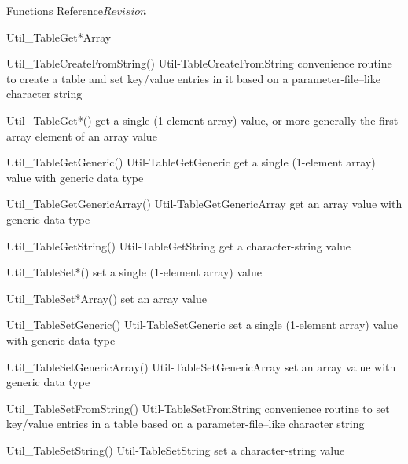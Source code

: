 \begin{cactuspart}{ Functions Reference}{}{$Revision$}
\begin{FunctionDescription}{Util\_TableGet*Array}
\begin{SeeAlsoSection}
\begin{SeeAlso2} {Util\_TableCreateFromString()} {Util-TableCreateFromString}
convenience routine to create a table and set key/value entries
in it based on a parameter-file--like character string
\end{SeeAlso2}
\begin{SeeAlso}{Util\_TableGet*()}
get a single (1-element array) value,
or more generally the first array element of an array value
\end{SeeAlso}
\begin{SeeAlso2} {Util\_TableGetGeneric()} {Util-TableGetGeneric}
get a single (1-element array) value with generic data type
\end{SeeAlso2}
\begin{SeeAlso2} {Util\_TableGetGenericArray()} {Util-TableGetGenericArray}
get an array value with generic data type
\end{SeeAlso2}
\begin{SeeAlso2} {Util\_TableGetString()} {Util-TableGetString}
get a character-string value
\end{SeeAlso2}
\begin{SeeAlso}{Util\_TableSet*()}
set a single (1-element array) value
\end{SeeAlso}
\begin{SeeAlso}{Util\_TableSet*Array()}
set an array value
\end{SeeAlso}
\begin{SeeAlso2} {Util\_TableSetGeneric()} {Util-TableSetGeneric}
set a single (1-element array) value with generic data type
\end{SeeAlso2}
\begin{SeeAlso2} {Util\_TableSetGenericArray()} {Util-TableSetGenericArray}
set an array value with generic data type
\end{SeeAlso2}
\begin{SeeAlso2} {Util\_TableSetFromString()} {Util-TableSetFromString}
convenience routine to set key/value entries in a table based on a
parameter-file--like character string
\end{SeeAlso2}
\begin{SeeAlso2} {Util\_TableSetString()} {Util-TableSetString}
set a character-string value
\end{SeeAlso2}
\end{SeeAlsoSection}


\end{FunctionDescription}
\end{cactuspart}
